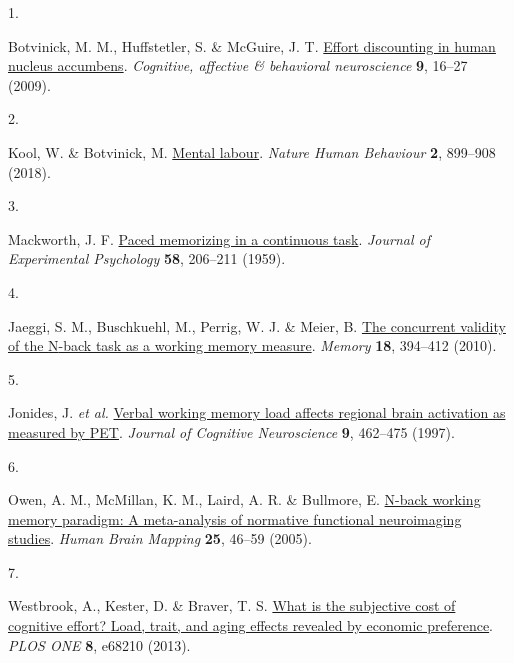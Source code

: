 \documentclass[
  man,floatsintext]{apa6}
\newlength{\cslhangindent}
\newlength{\csllabelwidth}
\newlength{\cslentryspacingunit} %
\newenvironment{CSLReferences}[2] %
 {%
  \setlength{\parindent}{0pt}
  \ifodd #1
  \let\oldpar\par
  \def\par{\hangindent=\cslhangindent\oldpar}
  \fi
  \setlength{\parskip}{#2\cslentryspacingunit}
 }%
 {}
\newcommand{\CSLLeftMargin}[1]{\parbox[t]{\csllabelwidth}{#1}}
\newcommand{\CSLRightInline}[1]{\parbox[t]{\linewidth - \csllabelwidth}{#1}\break}
\begin{document}
\begingroup
\setlength{\parindent}{-0.5in}
\setlength{\leftskip}{0.5in}

\hypertarget{refs}{}
\begin{CSLReferences}{0}{0}
\leavevmode{}%
\CSLLeftMargin{1. }%
\CSLRightInline{Botvinick, M. M., Huffstetler, S. \& McGuire, J. T. \href{https://doi.org/10.3758/CABN.9.1.16}{Effort discounting in human nucleus accumbens}. \emph{Cognitive, affective \& behavioral neuroscience} \textbf{9}, 16--27 (2009).}

\leavevmode{}%
\CSLLeftMargin{2. }%
\CSLRightInline{Kool, W. \& Botvinick, M. \href{https://doi.org/10.1038/s41562-018-0401-9}{Mental labour}. \emph{Nature Human Behaviour} \textbf{2}, 899--908 (2018).}

\leavevmode{}%
\CSLLeftMargin{3. }%
\CSLRightInline{Mackworth, J. F. \href{https://doi.org/10.1037/h0049090}{Paced memorizing in a continuous task}. \emph{Journal of Experimental Psychology} \textbf{58}, 206--211 (1959).}

\leavevmode{}%
\CSLLeftMargin{4. }%
\CSLRightInline{Jaeggi, S. M., Buschkuehl, M., Perrig, W. J. \& Meier, B. \href{https://doi.org/10.1080/09658211003702171}{The concurrent validity of the {N}-back task as a working memory measure}. \emph{Memory} \textbf{18}, 394--412 (2010).}

\leavevmode{}%
\CSLLeftMargin{5. }%
\CSLRightInline{Jonides, J. \emph{et al.} \href{https://doi.org/10.1162/jocn.1997.9.4.462}{Verbal working memory load affects regional brain activation as measured by {PET}}. \emph{Journal of Cognitive Neuroscience} \textbf{9}, 462--475 (1997).}

\leavevmode{}%
\CSLLeftMargin{6. }%
\CSLRightInline{Owen, A. M., McMillan, K. M., Laird, A. R. \& Bullmore, E. \href{https://doi.org/10.1002/hbm.20131}{N-back working memory paradigm: A meta-analysis of normative functional neuroimaging studies}. \emph{Human Brain Mapping} \textbf{25}, 46--59 (2005).}

\leavevmode{}%
\CSLLeftMargin{7. }%
\CSLRightInline{Westbrook, A., Kester, D. \& Braver, T. S. \href{https://doi.org/10.1371/journal.pone.0068210}{What is the subjective cost of cognitive effort? {Load}, trait, and aging effects revealed by economic preference}. \emph{PLOS ONE} \textbf{8}, e68210 (2013).}


\end{CSLReferences}
\end{document}
